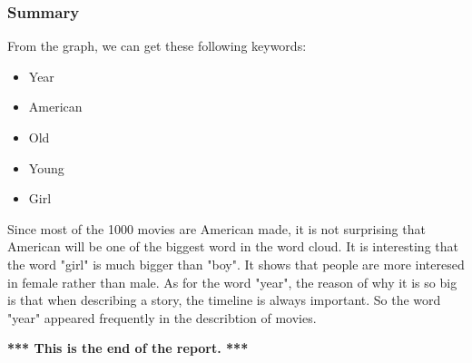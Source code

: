 \documentclass[11pt]{article}
\begin{document}
    \subsubsection{Summary}\label{summary}

From the graph, we can get these following keywords:
\begin{itemize}
    \item Year
    \item American
    \item Old
    \item Young
    \item Girl
\end{itemize}
Since most of the 1000 movies are American made, it is not surprising
that American will be one of the biggest word in the word cloud. It is
interesting that the word "girl" is much bigger than "boy". It shows
that people are more interesed in female rather than male. As for the
word "year", the reason of why it is so big is that when describing a
story, the timeline is always important. So the word "year" appeared
frequently in the describtion of movies.

\begin{center}
    \textbf{*** This is the end of the report. ***}
\end{center}
    
    
\end{document}
